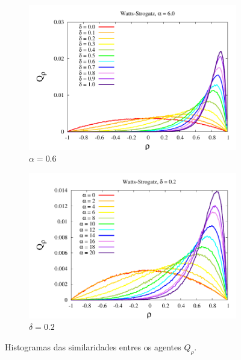 \begin{figure}
    \centering
    \begin{subfigure}[]{0.45\textwidth}
        \centering
        \includegraphics[width =\textwidth]{Figures/HistoDeltaBeta6}
        \caption{$\alpha = 0.6$}
        \label{fig:Histo-vd}
    \end{subfigure}
    \begin{subfigure}[]{0.45\textwidth}
        \centering
        \includegraphics[width =\textwidth]{Figures/HistoBetaDelta02}
        \caption{$\delta = 0.2$}
        \label{fig:Histo-va}
    \end{subfigure}
    \newline
    \caption{Histogramas das similaridades entres os agentes $Q_\rho$.}
    \label{fig:hist1}
\end{figure}

